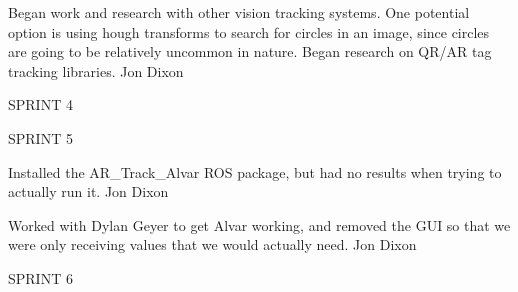 \begin{description}
\item[11/23/15] Began work and research with other vision tracking systems. One potential option is using hough transforms to search for circles in an image, since circles are going to be relatively uncommon in nature. Began research on QR/AR tag tracking libraries. \hfill{Jon Dixon}

\item SPRINT 4

\item SPRINT 5

\item [2/15/16]  Installed the AR\_Track\_Alvar ROS package, but had no results when trying to actually run it. \hfill{Jon Dixon}

\item [1/25/16]  Worked with Dylan Geyer to get Alvar working, and removed the GUI so that we were only receiving values that we would actually need.  \hfill{Jon Dixon}

\item SPRINT 6

\end{description}